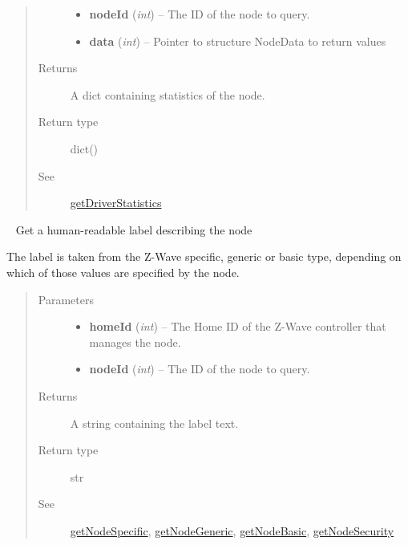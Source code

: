 \documentclass[letterpaper,10pt,english]{sphinxmanual}
\begin{document}
\begin{fulllineitems}
\begin{fulllineitems}
\begin{quote}
\begin{description}
\begin{itemize}
\item {} 
\textbf{nodeId} (\emph{int}) -- The ID of the node to query.

\item {} 
\textbf{data} (\emph{int}) -- Pointer to structure NodeData to return values

\end{itemize}

\item[{Returns}] \leavevmode
A dict containing statistics of the node.

\item[{Return type}] \leavevmode
dict()

\item[{See}] \leavevmode
{\hyperref[libopenzwave:getdriverstatistics]{getDriverStatistics}}

\end{description}\end{quote}

\end{fulllineitems}


\begin{fulllineitems}
\label{libopenzwave:libopenzwave.PyManager.getNodeType}~\label{libopenzwave:getnodetype}
Get a human-readable label describing the node

The label is taken from the Z-Wave specific, generic or basic type, depending
on which of those values are specified by the node.
\begin{quote}\begin{description}
\item[{Parameters}] \leavevmode\begin{itemize}
\item {} 
\textbf{homeId} (\emph{int}) -- The Home ID of the Z-Wave controller that manages the node.

\item {} 
\textbf{nodeId} (\emph{int}) -- The ID of the node to query.

\end{itemize}

\item[{Returns}] \leavevmode
A string containing the label text.

\item[{Return type}] \leavevmode
str

\item[{See}] \leavevmode
{\hyperref[libopenzwave:getnodespecific]{getNodeSpecific}}, {\hyperref[libopenzwave:getnodegeneric]{getNodeGeneric}}, {\hyperref[libopenzwave:getnodebasic]{getNodeBasic}}, {\hyperref[libopenzwave:getnodesecurity]{getNodeSecurity}}


\end{description}
\end{quote}
\end{fulllineitems}
\end{fulllineitems}
\end{document}
